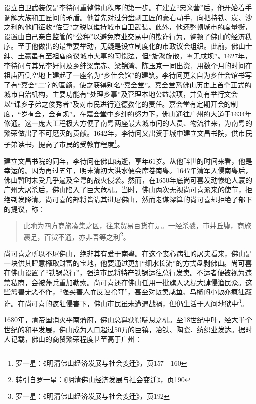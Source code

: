设立自卫武装仅是李待问重整佛山秩序的第一步。在建立“忠义营”后，他开始着手调解大族和工匠间的矛盾。他首先对过分盘剥工匠的豪右动手，向把持铁、炭、沙之利的他们征收“佐营”之税以维持城市自卫武装。此外，他还整顿城市的度量衡，设置由自己亲自监管的“公秤”以避免商业交易中的欺诈行为，整顿了佛山的经济秩序。至于他做出的最重要举动，无疑是设立制度化的市政议会组织。此前，佛山士绅、土豪虽有至祖庙商议城市大事的习惯法，但“旋聚旋散，率无成规”。1627年，李待问与其兄李好问及乡绅梁完赤、梁锦湾、陈玉京一同出资，用数个月的时间在祖庙西侧空地上建起了一座名为“乡仕会馆”的建筑。李待问更亲自为乡仕会馆书写了有“嘉会”二字的匾额，使之获得别名“嘉会堂”。嘉会堂系佛山历史上首个正式的城市自治机构，主要功能有“处理乡事”及管理本地公益款项，并负有举行文会以“课乡子弟之俊秀者”及对市民进行道德教化的责任。嘉会堂有定期开会的制度，“岁有会，会有规”。在嘉会堂中乡绅的努力下，佛山通往广州的大道于1634年修通。这一庞大工程极大方便了南粤两座最大城市间的人员、物流往来，为南粤的繁荣做出了不可磨灭的贡献。1642年，李待问又出资于城中建立文昌书院，供市民子弟读书，提高了市民的受教育程度\footnote{罗一星：《明清佛山经济发展与社会变迁》，页157—160}。

建立文昌书院的同年，李待问在佛山病逝，享年61岁。从他辞世的时间来看，他是幸运的。因为再过五年，明末清初大洪水便会席卷南粤。1647年清军入侵南粤后，佛山暂时未受几乎遍及全粤的战火侵袭。然而，在1650年底尚可喜发动惨绝人寰的广州大屠杀后，佛山陷入了巨大危机。当时，佛山两次无视尚可喜派来的使节，拒绝剃发降清。尚可喜的部将皆请其进屠佛山，然而老谋深算的尚可喜却拒绝了部下的提议，称：

\begin{quote}

此地为四方商旅凑集之区，往来贸易百货在是。一经杀戮，市井丘墟，商旅裹足，百货不通，亦非吾等之利\footnote{转引自罗一星：《明清佛山经济发展与社会变迁》，页190}。

\end{quote}

尚可喜之所以不屠佛山，绝非其有爱于南粤。在这个丧心病狂的屠夫看来，佛山是一块供其肆意榨取财富的宝地，他要通过更加“细水长流”的方式盘剥佛山。尚可喜在佛山设置了“铁锅总行”，强迫市民将特产铁锅运往总行发卖。不运者便被视为违禁私商，会被藩兵重加勒索。尚可喜还在佛山任用一批旗人恶棍大肆侵渔民众。这些禽兽无恶不作，“强买害人而反诬抢夺”，甚至对贩卖咸鱼、乌榄的小贩亦疯狂敲诈。在尚可喜的疯狂侵害下，佛山市民虽未遭遇战祸，但仍生活于人间地狱中\footnote{罗一星：《明清佛山经济发展与社会变迁》，页192}。

1680年，清帝国消灭平南藩府，佛山总算获得喘息之机。至18世纪中叶，经大半个世纪的和平发展，佛山成为人口超过50万的巨镇，冶铁、陶瓷、纺织业发达。据时人记载，佛山的商贸繁荣程度甚至高于广州：


